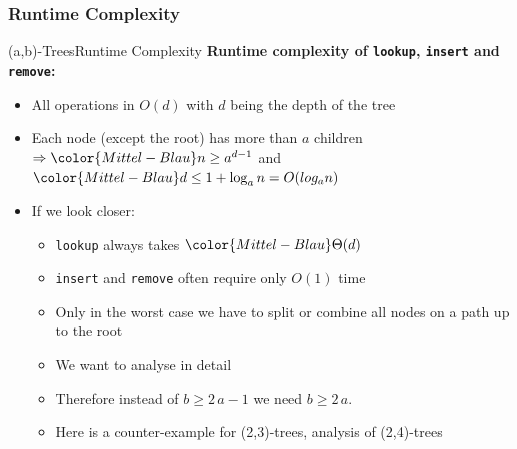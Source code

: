 
\subsubsection{Runtime Complexity}

\begin{frame}{(a,b)-Trees}{Runtime Complexity}
  \textbf{Runtime complexity of \texttt{\color{Mittel-Blau}lookup},
    \texttt{\color{Mittel-Blau}insert} and \texttt{\color{Mittel-Blau}remove}:}
  \begin{itemize}
    \item<2->
      All operations in {\color{Mittel-Blau}$O(d)$} with
      {\color{Mittel-Blau}$d$} being the depth of the tree
    \item<3->
      Each node (except the root) has more than {\color{Mittel-Blau}$a$}
      children\\
      \begin{math}
        \Rightarrow
        \color{Mittel-Blau}
        n \geq a^{d-1}
      \end{math}
      and
      \begin{math}
        \color{Mittel-Blau}
        d \leq 1 + \log_a n = O(log_a n)
      \end{math}
    \item<4->
      If we look closer:
      \begin{itemize}
        \item<5->
          \texttt{\color{Mittel-Blau}lookup} always takes
          \begin{math}
            \color{Mittel-Blau}
            \Theta(d)
          \end{math}
        \item<6->
          \texttt{\color{Mittel-Blau}insert} and
          \texttt{\color{Mittel-Blau}remove}
          often require only {\color{Mittel-Blau}$O(1)$} time
        \item<7->
          Only in the {\color{Mittel-Blau}worst case} we have to
          {\color{Mittel-Blau}split} or
          {\color{Mittel-Blau}combine} all nodes on a path up to the root
        \item<8->
          We want to analyse in detail
        \item<9->
          Therefore instead of {\color{Mittel-Blau}$b \geq 2 \, a - 1$}
          we need {\color{Mittel-Blau}$b \geq 2 \, a$}.
        \item<10-> Here is a counter-example for (2,3)-trees, analysis of (2,4)-trees
      \end{itemize}
  \end{itemize}
\end{frame}

